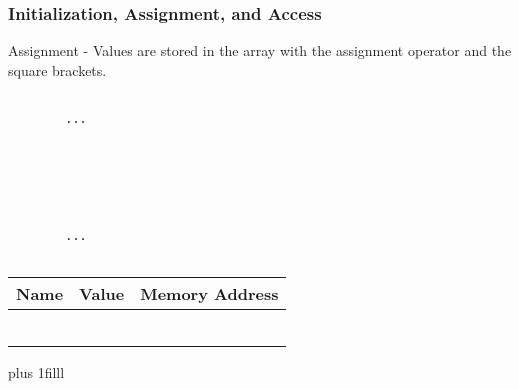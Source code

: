 \documentclass[fleqn]{beamer} %
\newcommand{\sectiontitleIII}{Initialization, Assignment, and Access}
\newcommand{\btVFill}{\vskip0pt plus 1filll}
\begin{document}
	\begin{frame}[label=sectionIII,containsverbatim] \small
	\frametitle{\sectiontitleIII}
	
	Assignment - Values are stored in the array with the assignment operator and the square brackets.  \vspace{5mm}\\
	
	\begin{multicols}{2}
		
		\begin{lstlisting}
		
		...
		
		
		
		
		
		
		...			
		
		\end{lstlisting}
		
		\renewcommand*{\arraystretch}{1.5}
		\begin{tabular}{c|c|c} 
			Name&Value&Memory Address\\ \hline
			& & \\ \hline
			& & \\ \hline
			& & \\ \hline
			& & \\ \hline
			& & \\ \hline
			& & \\ \hline
		\end{tabular}
		
		
		
	\end{multicols}
	
	\btVFill
	
	
\end{frame}
\end{document}
